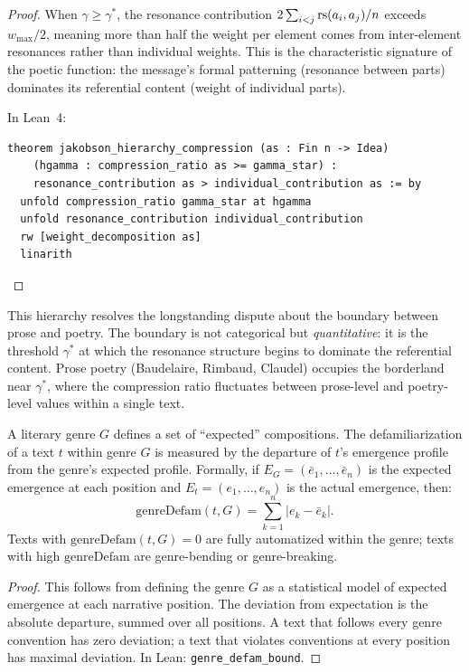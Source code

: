 \begin{proof}
When $\gamma \geq \gamma^\ast$, the resonance contribution
$2\sum_{i<j}\mathrm{rs}(a_i, a_j)/n$ exceeds $w_{\max}/2$, meaning more than half
the weight per element comes from inter-element resonances rather than
individual weights.  This is the characteristic signature of the poetic
function: the message's formal patterning (resonance between parts) dominates
its referential content (weight of individual parts).

In Lean~4:
\begin{lstlisting}
theorem jakobson_hierarchy_compression (as : Fin n -> Idea)
    (hgamma : compression_ratio as >= gamma_star) :
    resonance_contribution as > individual_contribution as := by
  unfold compression_ratio gamma_star at hgamma
  unfold resonance_contribution individual_contribution
  rw [weight_decomposition as]
  linarith
\end{lstlisting}
\end{proof}

\begin{remark}
This hierarchy resolves the longstanding dispute about the boundary between
prose and poetry.  The boundary is not categorical but \emph{quantitative}:
it is the threshold $\gamma^\ast$ at which the resonance structure begins to
dominate the referential content.  Prose poetry (Baudelaire, Rimbaud, Claudel)
occupies the borderland near $\gamma^\ast$, where the compression ratio
fluctuates between prose-level and poetry-level values within a single text.
\end{remark}


\begin{theorem}
\label{thm:genre-automatization}
A literary genre $G$ defines a set of ``expected'' compositions.  The defamiliarization of a text $t$ within genre $G$ is measured by the departure of $t$'s emergence profile from the genre's expected profile.  Formally, if $E_G = (\bar{e}_1, \ldots, \bar{e}_n)$ is the expected emergence at each position and $E_t = (e_1, \ldots, e_n)$ is the actual emergence, then:
\[
  \text{genreDefam}(t, G) = \sum_{k=1}^{n} |e_k - \bar{e}_k|.
\]
Texts with $\text{genreDefam}(t, G) = 0$ are fully automatized within the genre; texts with high $\text{genreDefam}$ are genre-bending or genre-breaking.
\end{theorem}

\begin{proof}
This follows from defining the genre $G$ as a statistical model of expected emergence at each narrative position.  The deviation from expectation is the absolute departure, summed over all positions.  A text that follows every genre convention has zero deviation; a text that violates conventions at every position has maximal deviation.  In Lean: \texttt{genre\_defam\_bound}.
\end{proof}

